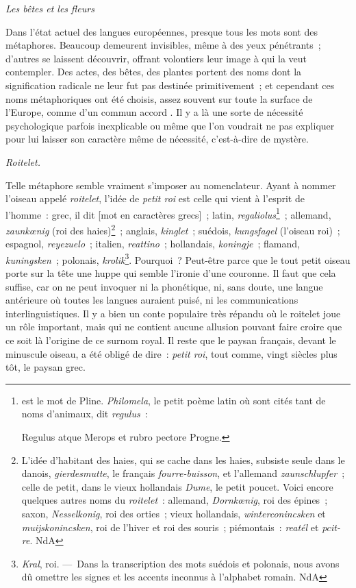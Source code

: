\documentclass[french,twoside]{book} %
\newcommand{\bibl}[1]{{\RaggedLeft{#1}\par\bigskip}}
\newcommand\chaptercont{} %
\begin{document}
\begin{center}\emph{Les bêtes et les fleurs}\end{center}

\chaptercont
\noindent Dans l’état actuel des langues européennes, presque tous les mots sont des métaphores. Beaucoup demeurent invisibles, même à des yeux pénétrants ; d’autres se laissent découvrir, offrant volontiers leur image à qui la veut contempler. Des actes, des bêtes, des plantes portent des noms dont la signification radicale ne leur fut pas destinée primitivement ; et cependant ces noms métaphoriques ont été choisis, assez souvent sur toute la surface de l’Europe, comme d’un commun accord . Il y a là une sorte de nécessité psychologique parfois inexplicable ou même que l’on voudrait ne pas expliquer pour lui laisser son caractère même de nécessité, c’est-à-dire de mystère.\par
{\itshape Roitelet.}\par
Telle métaphore semble vraiment s’imposer au nomenclateur. Ayant à nommer l’oiseau appelé {\itshape roitelet}, l’idée de {\itshape petit roi} est celle qui vient à l’esprit de l’homme : grec, il dit [mot en caractères grecs] ; latin, {\itshape regaliolus}\footnote{  est le mot de Pline. {\itshape Philomela}, le petit poème latin où sont cités tant de noms d’animaux, dit {\itshape regulus} :\par
  \noindent Regulus atque Merops et rubro pectore Progne.\par
 
\bibl{(Edition Nodier, 43.). NdA}
 } ; allemand, {\itshape zaunkœnig} (roi des haies)\footnote{ L’idée d’habitant des haies, qui se cache dans les haies, subsiste seule dans le danois, {\itshape gierdesmutte}, le français {\itshape fourre-buisson}, et l’allemand {\itshape zaunschlupfer} ; celle de petit, dans le vieux hollandais {\itshape Dume}, le petit poucet. Voici encore quelques autres noms du {\itshape roitelet} : allemand, {\itshape Dornkœnig}, roi des épines ; saxon, {\itshape Nesselkonig}, roi des orties ; vieux hollandais, {\itshape winterconincsken} et {\itshape muijskonincsken}, roi de l’hiver et roi des souris ; piémontais : {\itshape reatél} et {\itshape pcit-re}. NdA} ; anglais, {\itshape kinglet} ; suédois, {\itshape kungsfagel} (l’oiseau roi) ; espagnol, {\itshape reyezuelo} ; italien, {\itshape reattino} ; hollandais, {\itshape koningje} ; flamand, {\itshape kuningsken} ; polonais, {\itshape krolik}\footnote{ {\itshape Kral}, roi. — Dans la transcription des mots suédois et polonais, nous avons dû omettre les signes et les accents inconnus à l’alphabet romain. NdA}. Pourquoi ? Peut-être parce que le tout petit oiseau porte sur la tête une huppe qui semble l’ironie d’une couronne. Il faut que cela suffise, car on ne peut invoquer ni la phonétique, ni, sans doute, une langue antérieure où toutes les langues auraient puisé, ni les communications interlinguistiques. Il y a bien un conte populaire très répandu où le roitelet joue un rôle important, mais qui ne contient aucune allusion pouvant faire croire que ce soit là l’origine de ce surnom royal. Il reste que le paysan français, devant le minuscule oiseau, a été obligé de dire : {\itshape petit roi}, tout comme, vingt siècles plus tôt, le paysan grec.\par
\end{document}
